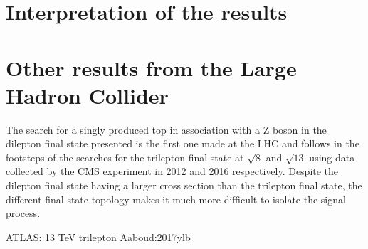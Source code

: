 \section{Interpretation of the results}
\section{Other results from the Large Hadron Collider}
The search for a singly produced top in association with a Z boson in the dilepton final state presented is the first one made at the LHC and follows in the footsteps of the searches for the trilepton final state at $\sqrt{8}$ and $\sqrt{13}$ using data collected by the CMS experiment in 2012 and 2016 respectively.
Despite the dilepton final state having a larger cross section than the trilepton final state, the different final state topology makes it much more difficult to isolate the signal process.

ATLAS: 13 TeV trilepton Aaboud:2017ylb
